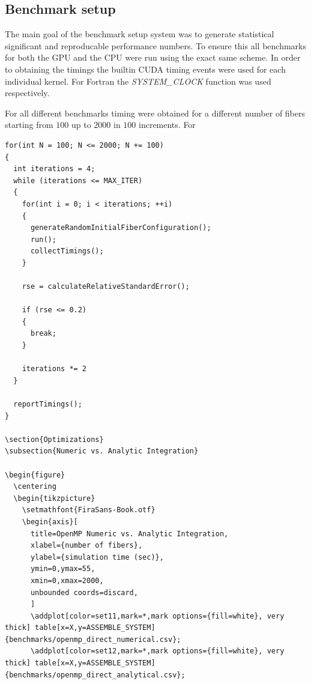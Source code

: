 \documentclass[a4paper,11pt]{kth-mag}
\begin{document}
\subsection{Benchmark setup}

The main goal of the benchmark setup system was to generate statistical significant and reproducable performance numbers. To ensure this all benchmarks for both the GPU and the CPU were run using the exact same scheme. In order to obtaining the timings the builtin CUDA timing events were used for each individual kernel. For Fortran the \emph{SYSTEM_CLOCK} function was used respectively.

For all different benchmarks timing were obtained for a different number of fibers starting from $100$ up to $2000$ in $100$ increments. For

\begin{listing}
  \centering
  \begin{verbatim}
for(int N = 100; N <= 2000; N += 100)
{
  int iterations = 4;
  while (iterations <= MAX_ITER)
  {
    for(int i = 0; i < iterations; ++i)
    {
      generateRandomInitialFiberConfiguration();
      run();
      collectTimings();
    }

    rse = calculateRelativeStandardError();

    if (rse <= 0.2)
    {
      break;
    }

    iterations *= 2
  }

  reportTimings();
}

\section{Optimizations}
\subsection{Numeric vs. Analytic Integration}

\begin{figure}
  \centering
  \begin{tikzpicture}
    \setmathfont{FiraSans-Book.otf}
    \begin{axis}[
      title=OpenMP Numeric vs. Analytic Integration,
      xlabel={number of fibers},
      ylabel={simulation time (sec)},
      ymin=0,ymax=55,
      xmin=0,xmax=2000,
      unbounded coords=discard,
      ]
      \addplot[color=set11,mark=*,mark options={fill=white}, very thick] table[x=X,y=ASSEMBLE_SYSTEM] {benchmarks/openmp_direct_numerical.csv};
      \addplot[color=set12,mark=*,mark options={fill=white}, very thick] table[x=X,y=ASSEMBLE_SYSTEM] {benchmarks/openmp_direct_analytical.csv};


\end{verbatim}
\end{listing}
\end{document}
